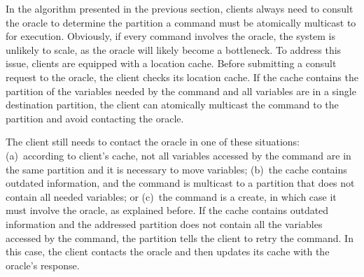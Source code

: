 In the algorithm presented in the previous section, clients always need to consult the oracle to determine the partition a command must be atomically multicast to for execution.
Obviously, if every command involves the oracle, the system is unlikely to scale, as the oracle will likely become a bottleneck.
To address this issue, clients are equipped with a location cache.
Before submitting a consult request to the oracle, the client checks its location cache.
If the cache contains the partition of the variables needed by the command and all variables are in a single destination partition, the client can atomically multicast the command to the partition and avoid contacting the oracle. 

The client still needs to contact the oracle in one of these situations:
(a)~according to client's cache, not all variables accessed by the command are in the same partition and it is necessary to move variables;
(b)~the cache contains outdated information, and the command is multicast to a partition that does not contain all needed variables; or
(c)~the command is a create, in which case it must involve the oracle, as explained before.
If the cache contains outdated information and the addressed partition does not contain all the variables accessed by the command, the partition tells the client to retry the command.
In this case, the client contacts the oracle and then updates its cache with the oracle's response.






